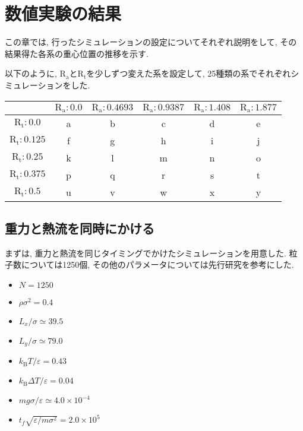 \chapter{数値実験の結果}\label{chap:simulation}

この章では, 行ったシミュレーションの設定についてそれぞれ説明をして, その結果得た各系の重心位置の推移を示す.

以下のように, $\text{R}_\text{a}$と$\text{R}_\text{t}$を少しずつ変えた系を設定して, 25種類の系でそれぞれシミュレーションをした.

\vspace{1\baselineskip}

\begin{center}
\begin{tabular}{|c|c|c|c|c|c|} \hline
        & $\text{R}_\text{a}:0.0$ & $\text{R}_\text{a}:0.4693$ & $\text{R}_\text{a}:0.9387$ & $\text{R}_\text{a}:1.408$ & $\text{R}_\text{a}:1.877$ \\ \hline
  $\text{R}_\text{t}:0.0$ & a      & b      & c      & d      & e     \\ \hline
  $\text{R}_\text{t}:0.125$ & f      & g      & h      & i      & j     \\ \hline
  $\text{R}_\text{t}:0.25$ & k      & l      & m      & n      & o     \\ \hline
  $\text{R}_\text{t}:0.375$ & p      & q      & r      & s      & t     \\ \hline
  $\text{R}_\text{t}:0.5$ & u      & v      & w      & x      & y     \\ \hline
\end{tabular}
\end{center}

\section{重力と熱流を同時にかける}\label{sec:RaRtmap}

\vspace{1\baselineskip}

まずは, 重力と熱流を同じタイミングでかけたシミュレーションを用意した. 粒子数については1250個, その他のパラメータについては先行研究\cite{Yoshida}を参考にした. 

\begin{itemize}
  \item $N = 1250$
  \item $\rho {\sigma}^2 = 0.4$
  \item $L_x / \sigma \simeq 39.5$
  \item $L_y / \sigma \simeq 79.0$
  \item $k_{\text{B}} T / \varepsilon = 0.43$
  \item $k_{\text{B}} \Delta T / \varepsilon = 0.04$
  \item $mg\sigma/\varepsilon \simeq 4.0 \times 10^{-4}$
  \item $t_f \sqrt{\varepsilon / m \sigma^2} = 2.0 \times 10^{5}$
\end{itemize}


